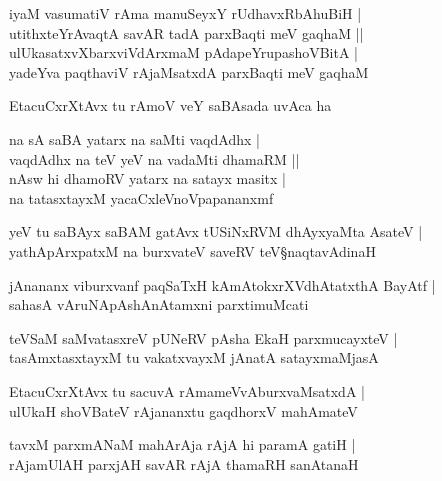 \begin{shloka}
iyaM vasumatiV rAma manuSeyxY rUdhavxRbAhuBiH |\\
utithxteYrAvaqtA savAR tadA parxBaqti meV gaqhaM ||\\
ulUkasatxvXbarxviVdArxmaM pAdapeYrupashoVBitA |\\
yadeYva paqthaviV rAjaMsatxdA parxBaqti meV gaqhaM 
\end{shloka}

\begin{shloka}
EtacuCxrXtAvx tu rAmoV veY saBAsada uvAca ha
\end{shloka}

\begin{shloka}
na sA saBA yatarx na saMti vaqdAdhx |\\
vaqdAdhx na teV yeV na vadaMti dhamaRM ||\\
nAsw hi dhamoRV yatarx na satayx masitx |\\
na tatasxtayxM yacaCxleVnoVpapananxmf
\end{shloka}

\begin{shloka}
yeV tu saBAyx saBAM gatAvx tUSiNxRVM dhAyxyaMta AsateV |\\
yathApArxpatxM na burxvateV saveRV teV\S naqtavAdinaH 
\end{shloka}

\begin{shloka}
jAnananx viburxvanf paqSaTxH kAmAtokxrXVdhAtatxthA BayAtf |\\
sahasA vAruNA\R pAshAnAtamxni parxtimuMcati
\end{shloka}

\begin{shloka}
teVSaM saMvatasxreV pUNeRV pAsha EkaH parxmucayxteV |\\
tasAmxtasxtayxM tu vakatxvayxM jAnatA satayxmaMjasA
\end{shloka}

\begin{shloka}
EtacuCxrXtAvx tu sacuvA rAmameVvAburxvaMsatxdA |\\
ulUkaH shoVBateV rAjananxtu gaqdhorxV mahAmateV 
\end{shloka}

\begin{shloka}
tavxM parxmANaM mahArAja rAjA hi paramA gatiH |\\
rAjamUlAH parxjAH savAR rAjA thamaRH sanAtanaH 
\end{shloka}

